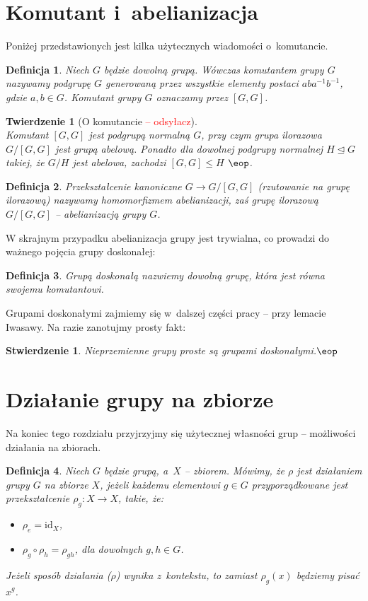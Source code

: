 \documentclass[licencjacka]{pracamgr}
\newtheorem{deff}{Definicja}[section]
\newtheorem{thh}{Twierdzenie}[section]
\newtheorem{fact}{Stwierdzenie}[section]
\begin{document}
\section{Komutant i~abelianizacja}
Poniżej przedstawionych jest kilka użytecznych wiadomości
o~komutancie.
\begin{deff}
    Niech $G$ będzie dowolną grupą. Wówczas \emph{komutantem grupy $G$} nazywamy podgrupę $G$ generowaną przez wszystkie elementy postaci
    $aba^{-1}b^{-1}$, gdzie $a, b \in G$. Komutant grupy $G$ oznaczamy przez $[G, G]$.
\end{deff}
\begin{thh}[O komutancie \textcolor{red}{ -- odsyłacz}] $ $\\
    Komutant $[G,G]$ jest podgrupą normalną $G$, przy czym grupa ilorazowa $G/[G,G]$ jest grupą abelową.
    Ponadto dla dowolnej podgrupy normalnej $H \trianglelefteq G$ takiej, że $G/H$ jest abelowa, zachodzi $[G,G] \le H$
    \quad$\eop$.
\end{thh}
\begin{deff}
    Przekształcenie kanoniczne $G \to G/[G,G]$ (rzutowanie na grupę ilorazową) nazywamy
    homomorfizmem abelianizacji, zaś grupę ilorazową $G/[G,G]$ -- abelianizacją grupy $G$.
\end{deff}

W skrajnym przypadku abelianizacja grupy jest trywialna, co prowadzi do ważnego pojęcia
grupy doskonałej:

\begin{deff}
    \emph{Grupą doskonałą} nazwiemy dowolną grupę, która jest równa swojemu komutantowi.
\end{deff}

Grupami doskonałymi zajmiemy się w~dalszej części pracy -- przy
lemacie Iwasawy. Na razie zanotujmy prosty fakt:

\begin{fact}
    Nieprzemienne grupy proste są grupami doskonałymi.\quad$\eop$
\end{fact}


\section{Działanie grupy na zbiorze}
Na koniec tego rozdziału przyjrzyjmy się użytecznej
własności grup -- możliwości działania na zbiorach.

\begin{deff}
    Niech $G$ będzie grupą, a~$X$ -- zbiorem. Mówimy, że \emph{$\rho$ jest działaniem grupy $G$ na zbiorze $X$},
    jeżeli każdemu elementowi $g \in G$ przyporządkowane jest przekształcenie $\rho_g\colon X \to X$, takie, że:
    \begin{itemize}
        \item $\rho_e = \mathrm{id}_X$,
        \item $\rho_g \circ \rho_h = \rho_{gh}$, dla dowolnych $g, h \in G$.
    \end{itemize}
    Jeżeli sposób działania ($\rho$) wynika z~kontekstu, to zamiast $\rho_g(x)$ będziemy pisać $x^g$.
\end{deff}
\end{document}
